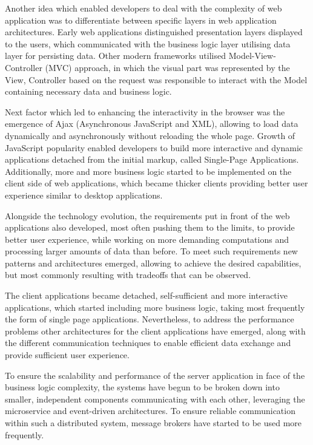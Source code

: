 Another idea which enabled developers to deal with the complexity of web application was to differentiate between specific layers in web application architectures. Early web applications distinguished presentation layers displayed to the users, which communicated with the business logic layer utilising data layer for persisting data. Other modern frameworks utilised Model-View-Controller (MVC) approach, in which the visual part was represented by the View, Controller based on the request was responsible to interact with the Model containing necessary data and business logic.

Next factor which led to enhancing the interactivity in the browser was the emergence of Ajax (Asynchronous JavaScript and XML), allowing to load data dynamically and asynchronously without reloading the whole page. Growth of JavaScript popularity enabled developers to build more interactive and dynamic applications detached from the initial markup, called Single-Page Applications. Additionally, more and more business logic started to be implemented on the client side of web applications, which became thicker clients providing better user experience similar to desktop applications.

Alongside the technology evolution, the requirements put in front of the web applications also developed, most often pushing them to the limits, to provide better user experience, while working on more demanding computations and processing larger amounts of data than before. To meet such requirements new patterns and architectures emerged, allowing to achieve the desired capabilities, but most commonly resulting with tradeoffs that can be observed.

The client applications became detached, self-sufficient and more interactive applications, which started including more business logic, taking most frequently the form of single page applications. Nevertheless, to address the performance problems other architectures for the client applications have emerged, along with the different communication techniques to enable efficient data exchange and provide sufficient user experience.

To ensure the scalability and performance of the server application in face of the business logic complexity, the systems have begun to be broken down into smaller, independent components communicating with each other, leveraging the microservice and event-driven architectures. To ensure reliable communication within such a distributed system, message brokers have started to be used more frequently.

